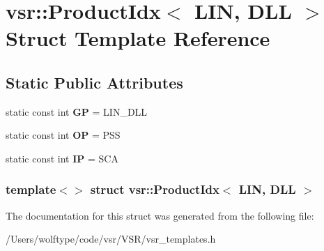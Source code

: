 \hypertarget{structvsr_1_1_product_idx_3_01_l_i_n_00_01_d_l_l_01_4}{\section{vsr\-:\-:Product\-Idx$<$ L\-I\-N, D\-L\-L $>$ Struct Template Reference}
\label{structvsr_1_1_product_idx_3_01_l_i_n_00_01_d_l_l_01_4}
}
\subsection*{Static Public Attributes}
\begin{DoxyCompactItemize}
\item 
\hypertarget{structvsr_1_1_product_idx_3_01_l_i_n_00_01_d_l_l_01_4_ac304c92ab7e7cca1c4b6f1d6a7fd6940}{static const int {\bfseries G\-P} = L\-I\-N\-\_\-\-D\-L\-L}\label{structvsr_1_1_product_idx_3_01_l_i_n_00_01_d_l_l_01_4_ac304c92ab7e7cca1c4b6f1d6a7fd6940}

\item 
\hypertarget{structvsr_1_1_product_idx_3_01_l_i_n_00_01_d_l_l_01_4_ae7edb7fb43c550e2a860e0ec65f1f057}{static const int {\bfseries O\-P} = P\-S\-S}\label{structvsr_1_1_product_idx_3_01_l_i_n_00_01_d_l_l_01_4_ae7edb7fb43c550e2a860e0ec65f1f057}

\item 
\hypertarget{structvsr_1_1_product_idx_3_01_l_i_n_00_01_d_l_l_01_4_a2df3b617c6f6f7490e42e27e92ee1859}{static const int {\bfseries I\-P} = S\-C\-A}\label{structvsr_1_1_product_idx_3_01_l_i_n_00_01_d_l_l_01_4_a2df3b617c6f6f7490e42e27e92ee1859}

\end{DoxyCompactItemize}
\subsubsection*{template$<$$>$ struct vsr\-::\-Product\-Idx$<$ L\-I\-N, D\-L\-L $>$}



The documentation for this struct was generated from the following file\-:\begin{DoxyCompactItemize}
\item 
/\-Users/wolftype/code/vsr/\-V\-S\-R/vsr\-\_\-templates.\-h\end{DoxyCompactItemize}
